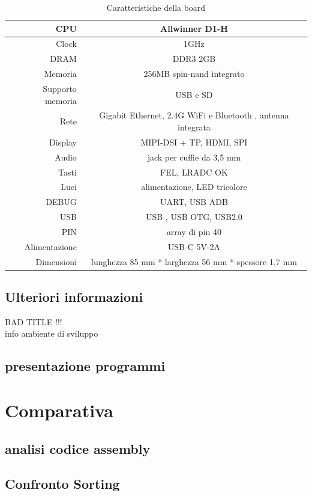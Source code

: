 \documentclass[12pt,a4paper]{report}
\begin{document}
\vspace{2cm}
\begin{table}
\centering
\begin{tabular}{|r|c|}
\hline
CPU & Allwinner D1-H \\
\hline
Clock & 1GHz\\
\hline
DRAM & DDR3 2GB\\
\hline
Memoria & 256MB  spin-nand integrato\\
\hline 
Supporto memoria & USB e  SD\\
\hline
Rete & Gigabit Ethernet,  2.4G WiFi e Bluetooth , antenna integrata\\
\hline
Display & MIPI-DSI + TP, HDMI, SPI \\
\hline
Audio & jack per cuffie da 3,5 mm\\
\hline
Tasti & FEL, LRADC OK\\
\hline
Luci &  alimentazione, LED tricolore\\
\hline
DEBUG & UART, USB ADB\\
\hline
USB & USB , USB OTG, USB2.0\\
\hline
PIN & array di pin 40\\
\hline
Alimentazione & USB-C  5V-2A\\
\hline
Dimensioni & lunghezza 85 mm * larghezza 56 mm * spessore 1,7 mm\\
\hline

\end{tabular}
\caption{Caratteristiche della board}
\end{table}

\section{Ulteriori informazioni}
BAD TITLE !!!\\
info ambiente di sviluppo
\section{presentazione programmi}

\chapter{Comparativa}
\section{analisi codice assembly}
\section{Confronto Sorting}
\end{document}
